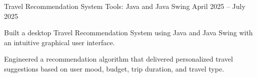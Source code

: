 \resumeProject
    {Travel Recommendation System}
    {Tools: Java and Java Swing}
    {April 2025 -- July 2025}
    {{} }
    \resumeItemListStart
      \item Built a desktop Travel Recommendation System using Java and Java Swing with an intuitive graphical user interface.
      \item Engineered a recommendation algorithm that delivered personalized travel suggestions based on user mood, budget, trip duration, and travel type.
    \resumeItemListEnd
